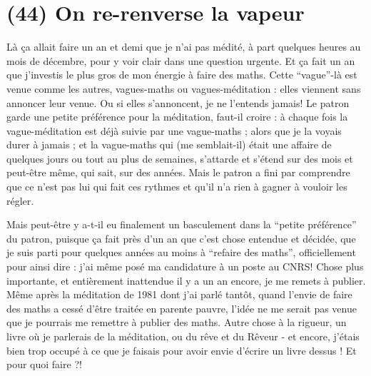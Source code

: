 \section{(44) On re-renverse la vapeur}

Là ça allait faire un an et demi que je n'ai pas médité, à part quelques heures au mois de décembre, pour y voir clair dans une question urgente. Et ça fait un an que j'investis le plus gros de mon énergie à faire des maths. Cette ``vague''-là est venue comme les autres, vagues-maths ou vagues-méditation : elles viennent sans annoncer leur venue. Ou si elles s'annoncent, je ne l'entends jamais! Le patron garde une petite préférence pour la méditation, faut-il croire : à chaque fois la vague-méditation est déjà suivie par une vague-maths ; alors que je la voyais durer à jamais ; et la vague-maths qui (me semblait-il) était une affaire de quelques jours ou tout au plus de semaines, s'attarde et s'étend sur des mois et peut-être même, qui sait, sur des années. Mais le patron a fini par comprendre que ce n'est pas lui qui fait ces rythmes et qu'il n'a rien à gagner à vouloir les régler.

Mais peut-être y a-t-il eu finalement un basculement dans la ``petite préférence'' du patron, puisque ça fait près d'un an que c'est chose entendue et décidée, que je suis parti pour quelques années au moins à ``refaire des maths'', officiellement pour ainsi dire : j'ai même posé ma candidature à un poste au CNRS! Chose plus importante, et entièrement inattendue il y a un an encore, je me remets à publier. Même après la méditation de 1981 dont j'ai parlé tantôt, quand l'envie de faire des maths a cessé d'être traitée en parente pauvre, l'idée ne me serait pas venue que je pourrais me remettre à publier des maths. Autre chose à la rigueur, un livre où je parlerais de la méditation, ou du rêve et du Rêveur - et encore, j'étais bien trop occupé à ce que je faisais pour avoir envie d'écrire un livre dessus ! Et pour quoi faire ?!

